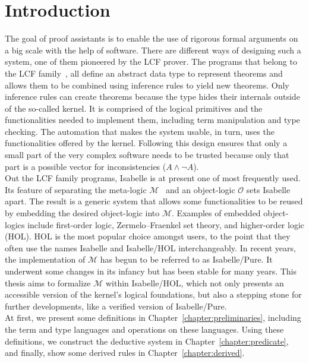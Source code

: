 
\chapter{Introduction}\label{chapter:introduction}

The goal of proof assistants is to enable the use of rigorous formal arguments on a big scale with the help of software.
There are different ways of designing such a system, one of them pioneered by the LCF prover.
The programs that belong to the LCF family~\parencite{Gordon2000}, all define an abstract data type to represent theorems and allows them to be combined using inference rules to yield new theorems.
Only inference rules can create theorems because the type hides their internals outside of the so-called kernel.
It is comprised of the logical primitives and the functionalities needed to implement them, including term manipulation and type checking.
The automation that makes the system usable, in turn, uses the functionalities offered by the kernel.
Following this design ensures that only a small part of the very complex software needs to be trusted because only that part is a possible vector for inconsistencies (\(A \land \neg A\)).\\

Out the LCF family programs, Isabelle is at present one of most frequently used.
Its feature of separating the meta-logic \(\mathcal{M}\)~\parencite{Paulson1988} and an object-logic \(\mathcal{O}\) sets Isabelle apart.
The result is a generic system that allows some functionalities to be reused by embedding the desired object-logic into \(\mathcal{M}\).
Examples of embedded object-logics include first-order logic, Zermelo–Fraenkel set theory, and higher-order logic (HOL).
HOL is the most popular choice amongst users, to the point that they often use the names Isabelle and Isabelle/HOL interchangeably.
In recent years, the implementation of \(\mathcal{M}\) has begun to be referred to as Isabelle/Pure.
It underwent some changes in its infancy but has been stable for many years.
This thesis aims to formalize \(\mathcal{M}\) within Isabelle/HOL, which not only presents an accessible version of the kernel's logical foundations, but also a stepping stone for further developments, like a verified version of Isabelle/Pure.\\

At first, we present some definitions in Chapter~\ref{chapter:preliminaries}, including the term and type languages and operations on these languages.
Using these definitions, we construct the deductive system in Chapter~\ref{chapter:predicate}, and finally, show some derived rules in Chapter~\ref{chapter:derived}.